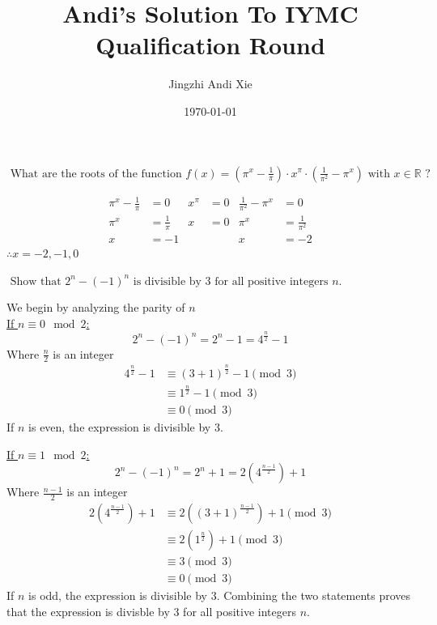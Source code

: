 \documentclass{article}
\title{Andi's Solution To IYMC Qualification Round}
\author{Jingzhi Andi Xie}
\date{\today}
\begin{document}
\maketitle


\begin{custom-big}[Problem A]
$\text { What are the roots of the function } f(x)=\left(\pi^x-\frac{1}{\pi}\right) \cdot x^\pi \cdot\left(\frac{1}{\pi^2}-\pi^x\right) \text { with } x \in \mathbb{R} \text { ? }$
\end{custom-big}

\begin{solution}
    \begin{align*}
        \pi^x-\frac{1}{\pi}&=0 & x^\pi&=0 &\frac{1}{\pi^2}-\pi^x&=0\\
        \pi^x&=\frac{1}{\pi} & x&=0 & \pi^x&=\frac{1}{\pi^2}\\
        x&=-1 & &&x&=-2
    \end{align*}
$\therefore x=-2,-1,0$
\end{solution}


\pagebreak
\begin{custom-big}[Problem B]
$\text { Show that } 2^n-(-1)^n \text { is divisible by } 3 \text { for all positive integers } n \text {. }$
\end{custom-big}

\begin{solution}
    We begin by analyzing the parity of $n$\\
    \underline{If $n\equiv 0\mod 2$:}\\
    \[2^n-(-1)^n=2^n-1=4^\frac{n}{2}-1\]
    Where $\frac n2$ is an integer
    \begin{align*}
        4^\frac{n}{2}-1&\equiv (3+1)^\frac{n}{2}-1 \pmod{3}\\
        &\equiv 1^\frac n2-1\pmod{3}\\
        &\equiv 0\pmod{3}
    \end{align*}
    If $n$ is even, the expression is divisible by 3.
    \bigskip
    
    \underline{If $n\equiv 1\mod 2$:}\\
    \[2^n-(-1)^n=2^n+1=2\left(4^\frac{n-1}{2}\right)+1\]
    Where $\frac{n-1}{2}$ is an integer
    \begin{align*}
       2\left(4^\frac{n-1}{2}\right)+1&\equiv 2\left((3+1)^\frac{n-1}{2}\right)+1 \pmod{3}\\
        &\equiv 2\left(1^\frac n2\right)+1\pmod{3}\\
        &\equiv 3\pmod{3}\\
        &\equiv 0\pmod{3}
    \end{align*}
    If $n$ is odd, the expression is divisible by 3. Combining the two statements proves that the expression is divisble by 3 for all positive integers $n$.
\end{solution}
\end{document}
